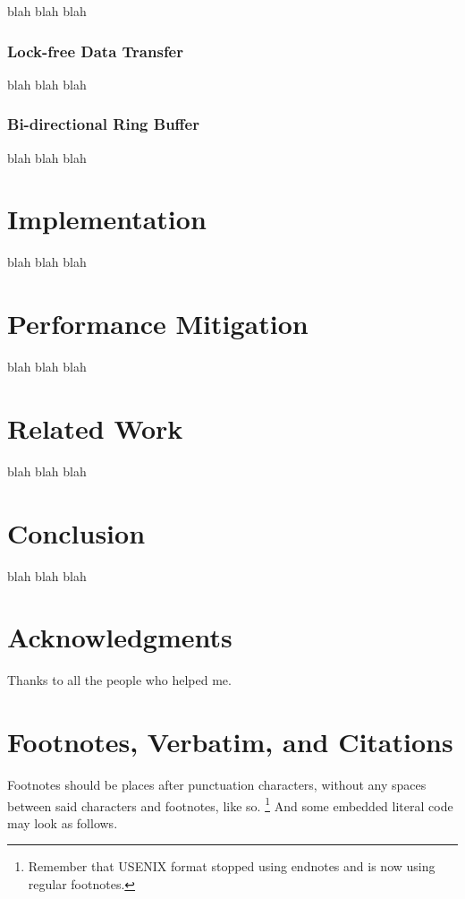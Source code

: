 \documentclass[letterpaper,twocolumn,10pt]{article}
\begin{document}
blah blah blah

\subsubsection{Lock-free Data Transfer}

blah blah blah

\subsubsection{Bi-directional Ring Buffer}

blah blah blah


\section{Implementation}

blah blah blah


\section{Performance Mitigation}

blah blah blah

\section{Related Work}

blah blah blah

\section{Conclusion}

blah blah blah

\section*{Acknowledgments}

Thanks to all the people who helped me.





\section{Footnotes, Verbatim, and Citations}

Footnotes should be places after punctuation characters, without any
spaces between said characters and footnotes, like so.%
\footnote{Remember that USENIX format stopped using endnotes and is
  now using regular footnotes.} And some embedded literal code may
look as follows.
\end{document}
